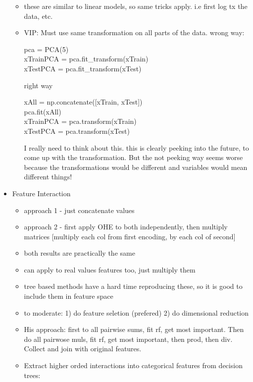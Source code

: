 \documentclass[a4paper]{report}
\newcommand{\brown}{\color{brown}}
\newenvironment{tightcenter}{
  \setlength\topsep{0pt}
  \setlength\parskip{0pt}
  \begin{center}
  }{
  \end{center}
}
\newenvironment{codesnip}[1]
{\begin{tightcenter}\begin{minipage}{.85\textwidth}#1}
{\end{minipage}\end{tightcenter}}
\begin{document}
\begin{itemize}
\begin{itemize}
      \item these are similar to linear models, so same tricks apply. i.e first log tx the data, etc.
      \item VIP: Must use same transformation on all parts of the data.
	\subitem wrong way:
	\begin{codesnip}{\brown}
	  pca = PCA(5) \\
	  xTrainPCA = pca.fit\_transform(xTrain)\\
	  xTestPCA = pca.fit\_transform(xTest)\\
	\end{codesnip}
	\subitem right way
	\begin{codesnip}{\brown}
	  xAll = np.concatenate([xTrain, xTest]) \\
	  pca.fit(xAll) \\
	  xTrainPCA = pca.transform(xTrain) \\
	  xTestPCA = pca.transform(xTest) 
	\end{codesnip}
	{\color{red} I really need to think about this. this is clearly peeking into the future, to come up with the transformation. But the not peeking way seems worse because the transformations would be different and variables would mean different things!}
    \end{itemize}
  \item Feature Interaction
    \begin{itemize}
      \item approach 1 -  just concatenate values
      \item approach 2 - first apply OHE to both independently, then multiply matrices [multiply each col from first encoding, by each col of second]
      \item both results are practically the same
      \item can apply to real values features too, just multiply them
      \item tree based methods have a hard time reproducing these, so it is good to include them in feature space
      \item to moderate: 1) do feature seletion (prefered) 2) do dimensional reduction
      \item His approach: first to all pairwise sums, fit rf, get most important. Then do all pairwose muls, fit rf, get most important, then prod, then div. Collect and join with original features.
      \item Extract higher orded interactions into categorical features from decision trees:
	\begin{itemize}

\end{itemize}
\end{itemize}
\end{itemize}
\end{document}
